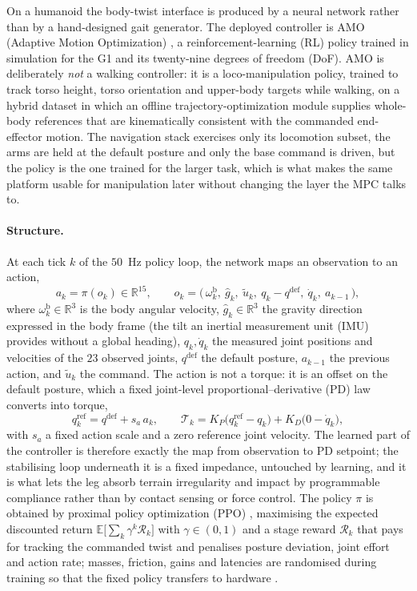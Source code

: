\documentclass[11pt,a4paper]{article}
\newcommand{\R}{\mathbb{R}}
\newcommand{\qdef}{q^{\mathrm{def}}}
\begin{document}
On a humanoid the body-twist interface is produced by a neural network rather than by a hand-designed gait
generator. The deployed controller is AMO (Adaptive Motion Optimization) \cite{li2025amo}, a
reinforcement-learning (RL) policy trained in simulation for the G1 and its twenty-nine degrees of freedom (DoF). AMO is deliberately \emph{not} a walking controller: it is a
loco-manipulation policy, trained to track torso height, torso orientation and upper-body targets while
walking, on a hybrid dataset in which an offline trajectory-optimization module supplies whole-body
references that are kinematically consistent with the commanded end-effector motion. The navigation stack
exercises only its locomotion subset, the arms are held at the default posture and only the base command
is driven, but the policy is the one trained for the larger task, which is what makes the same platform
usable for manipulation later without changing the layer the MPC talks to.

\paragraph{Structure.} At each tick $k$ of the $50$~Hz policy loop, the network maps an observation to an
action,
\begin{equation}
  a_k=\pi(o_k)\in\R^{15},
  \qquad
  o_k=\big(\,\omega^{\mathrm{b}}_k,\ \hat g_k,\ \tilde u_k,\ q_k-\qdef,\ \dot q_k,\ a_{k-1}\,\big),
  \label{eq:rlpolicy}
\end{equation}
where $\omega^{\mathrm{b}}_k\in\R^3$ is the body angular velocity, $\hat g_k\in\R^3$ the gravity direction
expressed in the body frame (the tilt an inertial measurement unit (IMU) provides without a global heading), $q_k,\dot q_k$ the
measured joint positions and velocities of the $23$ observed joints, $\qdef$ the default posture,
$a_{k-1}$ the previous action, and $\tilde u_k$ the command. The action is not a torque: it is an offset on
the default posture, which a fixed joint-level proportional--derivative (PD) law converts into torque,
\begin{equation}
  q_k^{\mathrm{ref}}=\qdef+s_a\,a_k,
  \qquad
  \mathcal{T}_k=K_P\big(q_k^{\mathrm{ref}}-q_k\big)+K_D\big(0-\dot q_k\big),
  \label{eq:rlpd}
\end{equation}
with $s_a$ a fixed action scale and a zero reference joint velocity. The learned part of the controller is
therefore exactly the map from observation to PD setpoint; the stabilising loop underneath it is a fixed
impedance, untouched by learning, and it is what lets the leg absorb terrain irregularity and impact by
programmable compliance rather than by contact sensing or force control. The policy $\pi$ is obtained by
proximal policy optimization (PPO) \cite{schulman2017ppo}, maximising the expected discounted return
$\mathbb{E}\big[\sum_k\gamma^k\mathcal{R}_k\big]$ with $\gamma\in(0,1)$ and a stage reward $\mathcal{R}_k$
that pays for tracking the commanded twist and penalises posture deviation, joint effort and action rate;
masses, friction, gains and latencies are randomised during training so that the fixed policy transfers to
hardware \cite{rudin2022walk}.
\end{document}
